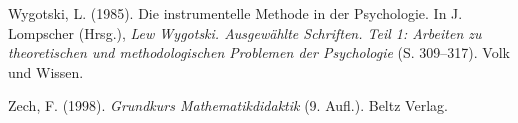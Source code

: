 \documentclass[
]{scrbook}
\newlength{\cslhangindent}
\newenvironment{CSLReferences}[2] %
 {\begin{list}{}{%
  \setlength{\itemindent}{0pt}
  \setlength{\leftmargin}{0pt}
  \setlength{\parsep}{0pt}
  \ifodd #1
   \setlength{\leftmargin}{\cslhangindent}
   \setlength{\itemindent}{-1\cslhangindent}
  \fi
  \setlength{\itemsep}{#2\baselineskip}}}
 {\end{list}}
\theoremstyle{definition}
\theoremstyle{definition}
\theoremstyle{definition}
\theoremstyle{definition}
\theoremstyle{remark}
\begin{document}
\begin{CSLReferences}{1}{0}
Wygotski, L. (1985). Die instrumentelle {Methode} in der {Psychologie}. In J. Lompscher (Hrsg.), \emph{Lew {Wygotski}. {Ausgewählte} {Schriften}. {Teil} 1: {Arbeiten} zu theoretischen und methodologischen {Problemen} der {Psychologie}} (S. 309--317). Volk und Wissen.

Zech, F. (1998). \emph{Grundkurs {Mathematikdidaktik}} (9. Aufl.). Beltz Verlag.

\end{CSLReferences}

\end{document}
